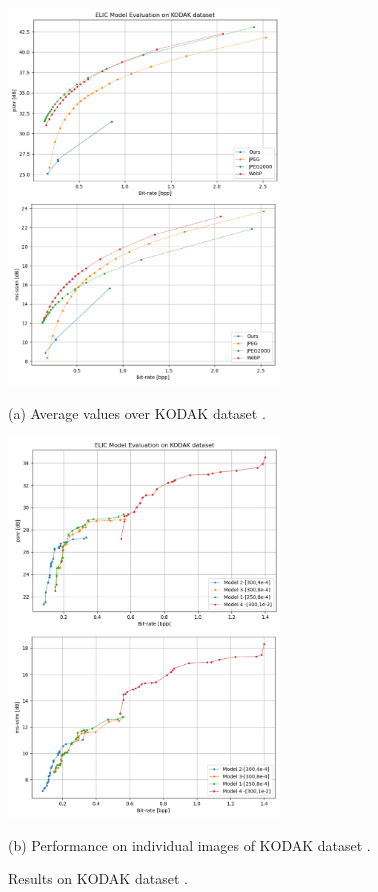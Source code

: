 \documentclass{article}
\begin{document}
\begin{figure}[h!]
\begin{minipage}[b]{0.8\linewidth}
    \centering
    \includegraphics[width=7.2cm]{kodak_fixed.png}
    \centerline{(a) Average values over KODAK dataset \cite{kodak}.}\medskip
\end{minipage}
\begin{minipage}[b]{0.8\linewidth}
    
    \centering
    \includegraphics[width=7.2cm]{kodak_per_fixed.png}
    \centerline{(b) Performance on individual images of KODAK dataset \cite{kodak}.}\medskip
\end{minipage}
    \label{fig:results}
    \caption{Results on KODAK dataset \cite{kodak}.}
\end{figure}
\end{document}
